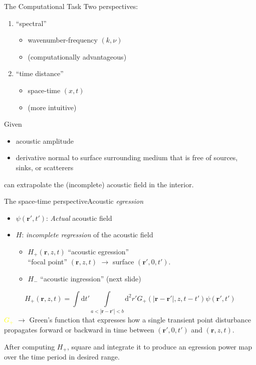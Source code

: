 \documentclass{beamer}
\begin{document}
\begin{frame}{The Computational Task}
    Two perspectives:
    \begin{enumerate}
        \item ``spectral''
            \begin{itemize}
                \item wavenumber-frequency $(k,\nu)$
                \item (computationally advantageous)
            \end{itemize}
        \item ``time distance''
            \begin{itemize}
                \item space-time $(x,t)$
                \item (more intuitive)
            \end{itemize}
    \end{enumerate}
    Given
    \begin{itemize}
        \item acoustic amplitude
        \item derivative normal to surface surrounding medium that is
            free of sources, sinks, or scatterers
    \end{itemize}
    can extrapolate the (incomplete) acoustic field in the interior.
\end{frame}

\begin{frame}{The space-time perspective}{Acoustic \emph{egression}}
    \begin{itemize}
        \item $\psi(\mathbf{r}',t')$: \emph{Actual} acoustic field
        \item $H$: \emph{incomplete regression} of the acoustic field
            \begin{itemize}
                \item $H_{+}(\mathbf{r},z,t)$ ``acoustic egression''\\
                    ``focal point'' $(\mathbf{r},z,t)$
                    $\rightarrow$ surface $(\mathbf{r}',0,t')$.
                \item $H_{-}$ ``acoustic ingression'' (next slide)
            \end{itemize}
    \end{itemize}
    $$ H_{+}(\mathbf{r},z,t) = \int
    \textrm{d}t' \int\limits_{a<|\mathbf{r}-\mathbf{r}'|<b}
    \textrm{d}^{2}r'G_{+}
    (|\mathbf{r}-\mathbf{r}'|,z,t-t')\psi(\mathbf{r}',t')  $$
    \textcolor{yellow}{$G_{+}$} $\rightarrow$
    Green's function that expresses how a single transient point
    disturbance propagates forward or backward in time between
    $(\mathbf{r}',0,t')$ and $(\mathbf{r},z,t)$.

    After computing $H_{+}$, square and integrate it to produce an egression
    power map over the time period in desired range.
\end{frame}
\end{document}

